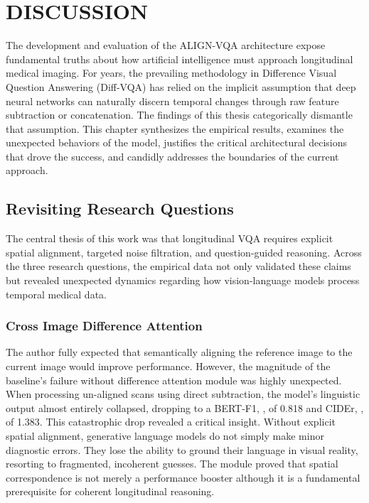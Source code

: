\setlength{\footskip}{8mm}


\chapter{DISCUSSION}
The development and evaluation of the ALIGN-VQA architecture expose fundamental truths about how artificial intelligence must approach longitudinal medical imaging. For years, the prevailing methodology in Difference Visual Question Answering (Diff-VQA) has relied on the implicit assumption that deep neural networks can naturally discern temporal changes through raw feature subtraction or concatenation. The findings of this thesis categorically dismantle that assumption. This chapter synthesizes the empirical results, examines the unexpected behaviors of the model, justifies the critical architectural decisions that drove the success, and candidly addresses the boundaries of the current approach.

\section{Revisiting Research Questions}
The central thesis of this work was that longitudinal VQA requires explicit spatial alignment, targeted noise filtration, and question-guided reasoning. Across the three research questions, the empirical data not only validated these claims but revealed unexpected dynamics regarding how vision-language models process temporal medical data.

\subsection{Cross Image Difference Attention}
The author fully expected that semantically aligning the reference image to the current image would improve performance. However, the magnitude of the baseline’s failure without difference attention module was highly unexpected. When processing un-aligned scans using direct subtraction, the model’s linguistic output almost entirely collapsed, dropping to a BERT-F1, \cite{bert-score}, of 0.818 and CIDEr, \cite{cider}, of 1.383. This catastrophic drop revealed a critical insight. Without explicit spatial alignment, generative language models do not simply make minor diagnostic errors. They lose the ability to ground their language in visual reality, resorting to fragmented, incoherent guesses. The module proved that spatial correspondence is not merely a performance booster although it is a fundamental prerequisite for coherent longitudinal reasoning.

